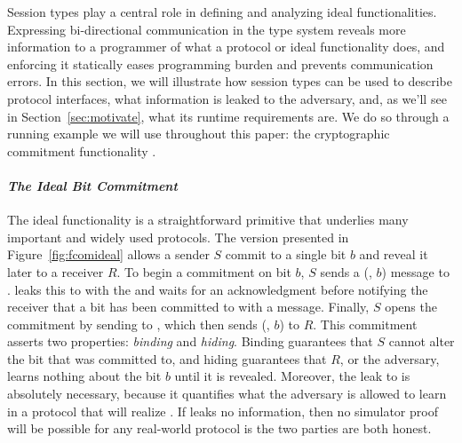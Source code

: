 
Session types play a central role in defining and analyzing ideal functionalities.
Expressing bi-directional communication in the type system reveals more information to a programmer of
what a protocol or ideal functionality does, and enforcing it statically eases programming burden
and prevents communication errors.
In this section, we will illustrate how session types can be used to describe protocol interfaces,
what information is leaked to the adversary, and, as we'll see in Section~\ref{sec:motivate}, what its runtime requirements are.
We do so through a running example we will use throughout this paper: the cryptographic commitment functionality \Fcom.

\paragraph*{\textbf{\textit{The Ideal Bit Commitment}}}
The ideal functionality \Fcom is a straightforward primitive that underlies many important and widely used protocols. 
The version presented in Figure~\ref{fig:fcomideal} allows a sender $S$ commit to a single bit $b$ and reveal it later to a receiver $R$.
To begin a commitment on bit $b$, $S$ sends a (, $b$) message to \Fcom.
\Fcom leaks this to \A with the  and waits for an acknowledgment before notifying the receiver
that a bit has been committed to with a  message.
Finally, $S$ opens the commitment by sending  to \Fcom, which then sends (, $b$) to $R$.
This commitment asserts two properties: \emph{binding} and \emph{hiding}.
Binding guarantees that $S$ cannot alter the bit that was committed to, and hiding guarantees that $R$,
or the adversary, learns nothing about the bit $b$ until it is revealed.
Moreover, the leak to \A is absolutely necessary, because it quantifies what the adversary is allowed to
learn in a protocol that will realize \Fcom. 
If \Fcom leaks no information, then no simulator proof will be possible for any real-world protocol is the two parties are both honest.

